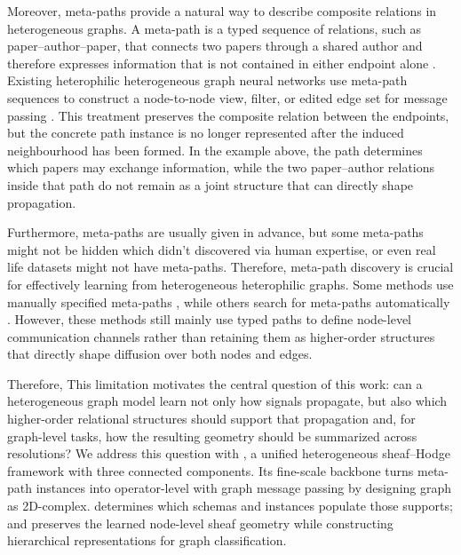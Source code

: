 Moreover, meta-paths provide a natural way to describe composite relations in heterogeneous graphs. A
meta-path is a typed sequence of relations, such as paper--author--paper, that connects two papers
through a shared author and therefore expresses information that is not contained in either
endpoint alone \cite{sun2011pathsim}. Existing heterophilic heterogeneous graph neural networks use meta-path sequences to construct
a node-to-node view, filter, or edited edge set for message passing
\cite{lu2026addressing,chen2025adaptive,li2025hetero2net,guo2023homophily,shen2025heterophily,wang2025homophily}.
This treatment preserves the composite relation between the endpoints, but the concrete path
instance is no longer represented after the induced neighbourhood has been formed. In the example
above, the path determines which papers may exchange information, while the two paper--author
relations inside that path do not remain as a joint structure that can directly shape propagation.

Furthermore, meta-paths are usually given in advance, but some meta-paths might not be hidden which didn't discovered via human expertise, or even real life datasets might not have meta-paths. Therefore, meta-path discovery is crucial for effectively learning from heterogeneous heterophilic graphs. Some methods use manually specified meta-paths \cite{wang2019han,fu2020magnn}, while others search for meta-paths automatically \cite{yan2024lmsps,jiang2022pmmm}. However, these methods still mainly use typed paths to define node-level communication channels rather than retaining them as higher-order structures that directly shape diffusion over both nodes and edges.

Therefore, This limitation motivates the central question of this work: can a heterogeneous graph model
learn not only how signals propagate, but also which higher-order relational structures should
support that propagation and, for graph-level tasks, how the resulting geometry should be
summarized across resolutions? We address this question with \method{}, a unified heterogeneous
sheaf--Hodge framework with three connected components. Its fine-scale backbone turns meta-path instances into operator-level with graph message passing by designing graph as 2D-complex. \ampss{} determines which schemas
and instances populate those supports; and \thspool{} preserves the learned node-level sheaf
geometry while constructing hierarchical representations for graph classification.



